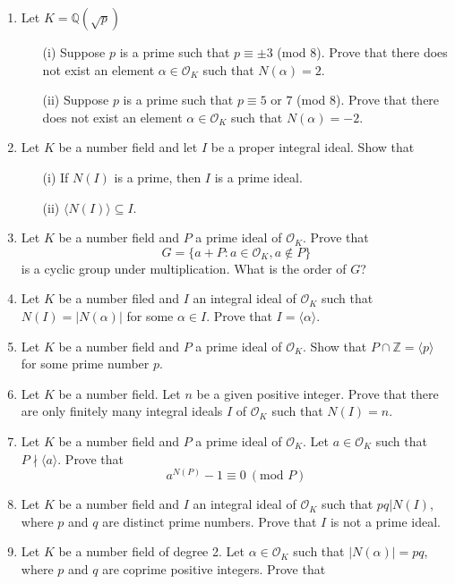 \begin{enumerate}
\begin{enumerate}
\end{enumerate}
\item Let $K=\mathbb{Q}(\sqrt{p})$
\begin{enumerate}
\item[(i)] Suppose $p$ is a prime such that $p \equiv \pm 3$ (mod $8$). Prove that there does not exist an element $\alpha \in \mathcal{O}_K$ such that $N(\alpha)=2$.
\item[(ii)] Suppose $p$ is a prime such that $p \equiv 5 \text{ or } 7$ (mod $8$). Prove that there does not exist an element $\alpha \in \mathcal{O}_K$ such that $N(\alpha)=-2$.
\end{enumerate}
\item Let $K$ be a number field and let $I$ be a proper integral ideal. Show that
\begin{enumerate}
\item[(i)] If $N(I)$ is a prime, then $I$ is a prime ideal.
\item[(ii)] $\langle N(I) \rangle \subseteq I$.
\end{enumerate}
\item Let $K$ be a number field and $P$ a prime ideal of $\mathcal{O}_K$. Prove that
$$G=\{a+P: a \in \mathcal{O}_K, a \not \in P\}$$
is a cyclic group under multiplication. What is the order of $G$?
\item Let $K$ be a number filed and $I$ an integral ideal of $\mathcal{O}_K$ such that
$N(I)=|N(\alpha)|$ for some $\alpha \in I$. Prove that $I=\langle \alpha \rangle$.
\item Let $K$ be a number field and $P$ a prime ideal of $\mathcal{O}_K$. Show that $P \cap \mathbb{Z}=\langle p \rangle$ for some prime number $p$.
\item Let $K$ be a number field. Let $n$ be a given positive integer. Prove that there are only finitely many integral ideals $I$ of $\mathcal{O}_K$ such that $N(I)=n$.
\item Let $K$ be a number field and $P$ a prime ideal of $\mathcal{O}_K$. Let $a \in \mathcal{O}_K$ such that
$P \nmid \langle a \rangle$. Prove that
$$a^{N(P)}-1 \equiv 0~(\text{mod } P)$$
\item Let $K$ be a number field and $I$ an integral ideal of $\mathcal{O}_K$ such that $pq \big|N(I)$, where
$p$ and $q$ are distinct prime numbers. Prove that $I$ is not a prime ideal.
\item Let $K$ be a number field of degree 2. Let $\alpha \in \mathcal{O}_K$ such that $|N(\alpha)|=pq$, where
$p$ and $q$ are coprime positive integers. Prove that

\end{enumerate}

